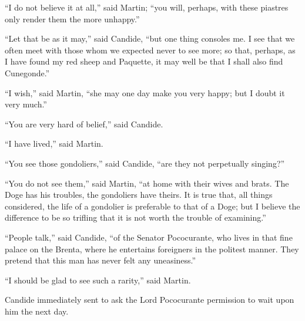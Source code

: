 ``I do not believe it at all,'' said Martin; ``you will, perhaps, with these piastres only render them the more unhappy.''

``Let that be as it may,'' said Candide, ``but one thing consoles me. I see that we often meet with those whom we expected never to see more; so that, perhaps, as I have found my red sheep and Paquette, it may well be that I shall also find Cunegonde.''

``I wish,'' said Martin, ``she may one day make you very happy; but I doubt it very much.''

``You are very hard of belief,'' said Candide.

``I have lived,'' said Martin.

``You see those gondoliers,'' said Candide, ``are they not perpetually singing?''

``You do not see them,'' said Martin, ``at home with their wives and brats. The Doge has his troubles, the gondoliers have theirs. It is true that, all things considered, the life of a gondolier is preferable to that of a Doge; but I believe the difference to be so trifling that it is not worth the trouble of examining.''

``People talk,'' said Candide, ``of the Senator Pococurante, who lives in that fine palace on the Brenta, where he entertains foreigners in the politest manner. They pretend that this man has never felt any uneasiness.''

``I should be glad to see such a rarity,'' said Martin.

Candide immediately sent to ask the Lord Pococurante permission to wait upon him the next day.

